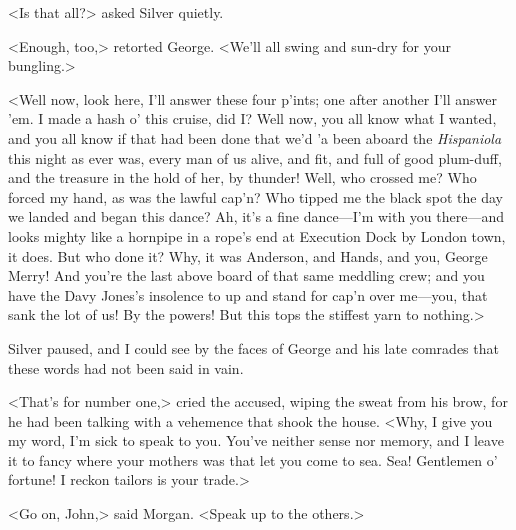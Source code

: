<Is that all?> asked Silver quietly.

<Enough, too,> retorted George. <We'll all swing and sun-dry for your bungling.>

<Well now, look here, I'll answer these four p'ints; one after another I'll answer 'em. I made a hash o' this cruise, did I\@? Well now, you all know what I wanted, and you all know if that had been done that we'd 'a been aboard the \textit{Hispaniola} this night as ever was, every man of us alive, and fit, and full of good plum-duff, and the treasure in the hold of her, by thunder! Well, who crossed me? Who forced my hand, as was the lawful cap'n? Who tipped me the black spot the day we landed and began this dance? Ah, it's a fine dance—I'm with you there—and looks mighty like a hornpipe in a rope's end at Execution Dock by London town, it does. But who done it? Why, it was Anderson, and Hands, and you, George Merry! And you're the last above board of that same meddling crew; and you have the Davy Jones's insolence to up and stand for cap'n over me—you, that sank the lot of us! By the powers! But this tops the stiffest yarn to nothing.>

Silver paused, and I could see by the faces of George and his late comrades that these words had not been said in vain.

<That's for number one,> cried the accused, wiping the sweat from his brow, for he had been talking with a vehemence that shook the house. <Why, I give you my word, I'm sick to speak to you. You've neither sense nor memory, and I leave it to fancy where your mothers was that let you come to sea. Sea! Gentlemen o' fortune! I reckon tailors is your trade.>

<Go on, John,> said Morgan. <Speak up to the others.>

